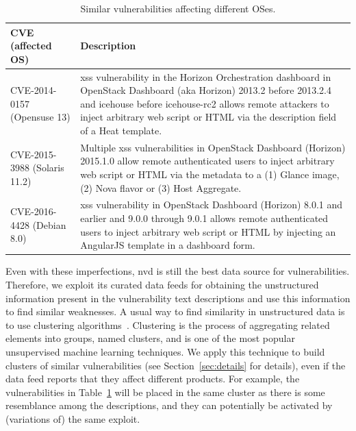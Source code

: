 \begin{table}[!t]
\begin{center}
{\scriptsize
\begin{tabular}{| p{2.3cm} | p{10cm} | }\hline
\textbf{CVE (affected OS)} & \textbf{Description} \\\hline\hline
CVE-2014-0157 (Opensuse 13) & \scriptsize \gls{xss} vulnerability in the Horizon Orchestration dashboard in OpenStack Dashboard (aka Horizon) 2013.2 before 2013.2.4 and icehouse before icehouse-rc2 allows remote attackers to inject arbitrary web script or HTML via the description field of a Heat template. \\ \hline
CVE-2015-3988 (Solaris 11.2) & \scriptsize Multiple \gls{xss} vulnerabilities in OpenStack Dashboard (Horizon) 2015.1.0 allow remote authenticated users to inject arbitrary web script or HTML via the metadata to a (1) Glance image, (2) Nova flavor or (3) Host Aggregate. \\ \hline
CVE-2016-4428 (Debian 8.0) & \scriptsize \gls{xss} vulnerability in OpenStack Dashboard (Horizon) 8.0.1 and earlier and 9.0.0 through 9.0.1 allows remote authenticated users to inject arbitrary web script or HTML by injecting an AngularJS template in a dashboard form. \\ \hline
\end{tabular}
}
\caption{Similar vulnerabilities affecting different OSes.}
\label{tab:missing_products}
\end{center}
\end{table}

Even with these imperfections, \gls{nvd} is still the best data source for vulnerabilities.
Therefore, we exploit its curated data feeds for obtaining the unstructured information present in the vulnerability text descriptions and use this information to find similar weaknesses.
A usual way to find similarity in unstructured data is to use clustering algorithms~\cite{Jain:2010}.
Clustering is the process of aggregating related elements into groups, named clusters, and is one of the most popular unsupervised machine learning techniques. 
We apply this technique to build clusters of similar vulnerabilities (see Section~\ref{sec:details} for details), even if the data feed reports that they affect different products.
For example, the vulnerabilities in Table~\ref{tab:missing_products} will be placed in the same cluster as there is some resemblance among the descriptions, and they can potentially be activated by (variations of) the same exploit.

